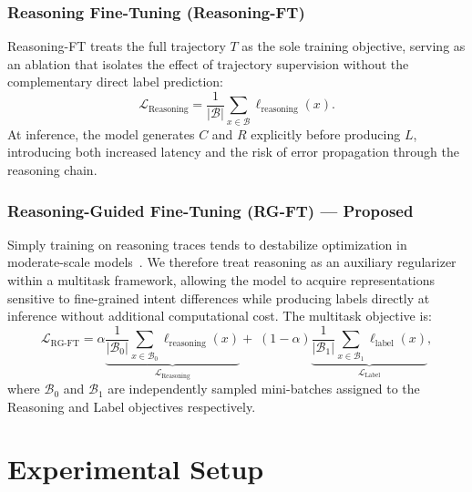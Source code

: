 \documentclass[cameraready]{Interspeech}
\begin{document}
\subsubsection{Reasoning Fine-Tuning (Reasoning-FT)}
Reasoning-FT treats the full trajectory $T$ as the sole training
objective, serving as an ablation that isolates the effect of
trajectory supervision without the complementary direct label prediction:
\begin{equation}
  \mathcal{L}_{\text{Reasoning}}
  = \frac{1}{|\mathcal{B}|}
    \sum_{x \in \mathcal{B}} \ell_{\text{reasoning}}(x).
\end{equation}
At inference, the model generates $C$ and $R$ explicitly before
producing $L$, introducing both increased latency and the risk of error
propagation through the reasoning chain.

\subsubsection{Reasoning-Guided Fine-Tuning (RG-FT) --- Proposed}
Simply training on reasoning traces tends to destabilize optimization
in moderate-scale models~\cite{li-etal-2025-small-models,
chen-etal-2025-unveiling-key,chen-etal-2025-skip,hsieh-etal-2023-distilling}.
We therefore treat reasoning as an auxiliary regularizer within a
multitask framework, allowing the model to acquire representations
sensitive to fine-grained intent differences while producing labels
directly at inference without additional computational cost.
The multitask objective is:
\begin{equation}
  \mathcal{L}_{\text{RG-FT}}
  = \alpha
    \underbrace{
      \frac{1}{|\mathcal{B}_0|}
      \sum_{x \in \mathcal{B}_0} \ell_{\text{reasoning}}(x)
    }_{\mathcal{L}_{\text{Reasoning}}}
  +\; (1-\alpha)
    \underbrace{
      \frac{1}{|\mathcal{B}_1|}
      \sum_{x \in \mathcal{B}_1} \ell_{\text{label}}(x)
    }_{\mathcal{L}_{\text{Label}}},
\end{equation}
where $\mathcal{B}_0$ and $\mathcal{B}_1$ are independently sampled
mini-batches assigned to the Reasoning and Label objectives respectively.








\section{Experimental Setup}
\label{sec:experiments}
\end{document}
